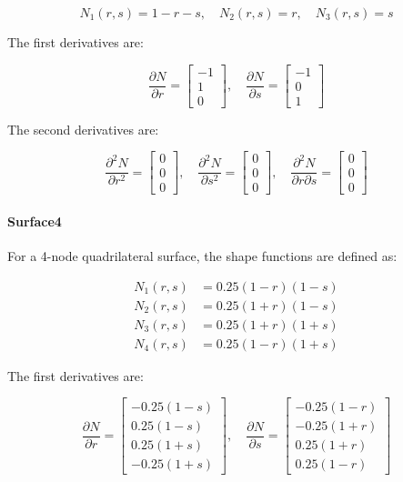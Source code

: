 \[
N_1(r, s) = 1 - r - s, \quad N_2(r, s) = r, \quad N_3(r, s) = s
\]

The first derivatives are:

\[
\frac{\partial N}{\partial r} =
\begin{bmatrix}
-1 \\
1 \\
0
\end{bmatrix}, \quad
\frac{\partial N}{\partial s} =
\begin{bmatrix}
-1 \\
0 \\
1
\end{bmatrix}
\]

The second derivatives are:

\[
\frac{\partial^2 N}{\partial r^2} =
\begin{bmatrix}
0 \\
0 \\
0
\end{bmatrix}, \quad
\frac{\partial^2 N}{\partial s^2} =
\begin{bmatrix}
0 \\
0 \\
0
\end{bmatrix}, \quad
\frac{\partial^2 N}{\partial r \partial s} =
\begin{bmatrix}
0 \\
0 \\
0
\end{bmatrix}
\]

\paragraph{Surface4} For a 4-node quadrilateral surface, the shape functions are defined as:

\[
\begin{aligned}
N_1(r, s) &= 0.25 (1 - r)(1 - s) \\
N_2(r, s) &= 0.25 (1 + r)(1 - s) \\
N_3(r, s) &= 0.25 (1 + r)(1 + s) \\
N_4(r, s) &= 0.25 (1 - r)(1 + s)
\end{aligned}
\]

The first derivatives are:

\[
\frac{\partial N}{\partial r} =
\begin{bmatrix}
-0.25 (1 - s) \\
0.25 (1 - s) \\
0.25 (1 + s) \\
-0.25 (1 + s)
\end{bmatrix}, \quad
\frac{\partial N}{\partial s} =
\begin{bmatrix}
-0.25 (1 - r) \\
-0.25 (1 + r) \\
0.25 (1 + r) \\
0.25 (1 - r)
\end{bmatrix}
\]

